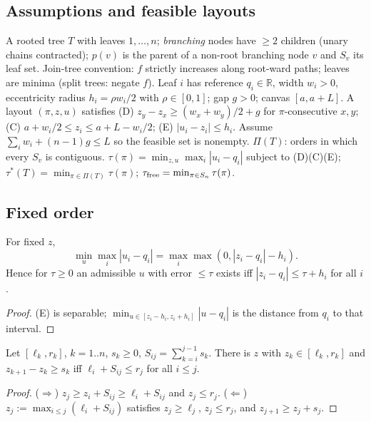 \subsection{Assumptions and feasible layouts}
A rooted tree $T$ with leaves $1,\dots,n$; \emph{branching} nodes have $\ge 2$ children (unary chains contracted); $p(v)$ is the parent of a non-root branching node $v$ and $S_v$ its leaf set. Join-tree convention: $f$ strictly increases along root-ward paths; leaves are minima (split trees: negate $f$).
Leaf $i$ has reference $q_i\in\mathbb R$, width $w_i>0$, eccentricity radius $h_i=\rho w_i/2$ with $\rho\in[0,1]$; gap $g>0$; canvas $[a,a+L]$.
A layout $(\pi,z,u)$ satisfies
(D) $z_y-z_x\ge (w_x+w_y)/2+g$ for $\pi$-consecutive $x,y$;
(C) $a+w_i/2\le z_i\le a+L-w_i/2$;
(E) $|u_i-z_i|\le h_i$.
Assume $\sum_iw_i+(n-1)g\le L$ so the feasible set is nonempty.
$\Pi(T)$: orders in which every $S_v$ is contiguous.
$\tau(\pi)=\min_{z,u}\max_i|u_i-q_i|$ subject to (D)(C)(E); $\tau^*(T)=\min_{\pi\in\Pi(T)}\tau(\pi)$; $\tau_{\rm free}=\min_{\pi\in S_n}\tau(\pi)$.

\subsection{Fixed order}
\begin{lemma}\label{lem:anchor}
For fixed $z$,
\[\min_u\max_i|u_i-q_i| = \max_i\max(0,|z_i-q_i|-h_i).\] Hence for $\tau\ge0$ an admissible $u$ with error $\le\tau$ exists iff $|z_i-q_i|\le\tau+h_i$ for all $i$.
\end{lemma}
\begin{proof}(E) is separable; $\min_{u\in[z_i-h_i,z_i+h_i]}|u-q_i|$ is the distance from $q_i$ to that interval.\end{proof}

\begin{lemma}\label{lem:chain}
Let $[\ell_k,r_k]$, $k=1..n$, $s_k\ge0$, $S_{ij}=\sum_{k=i}^{j-1}s_k$. There is $z$ with $z_k\in[\ell_k,r_k]$ and $z_{k+1}-z_k\ge s_k$ iff $\ell_i+S_{ij}\le r_j$ for all $i\le j$.
\end{lemma}
\begin{proof}($\Rightarrow$) $z_j\ge z_i+S_{ij}\ge\ell_i+S_{ij}$ and $z_j\le r_j$. ($\Leftarrow$) $z_j:=\max_{i\le j}(\ell_i+S_{ij})$ satisfies $z_j\ge\ell_j$, $z_j\le r_j$, and $z_{j+1}\ge z_j+s_j$.\end{proof}

